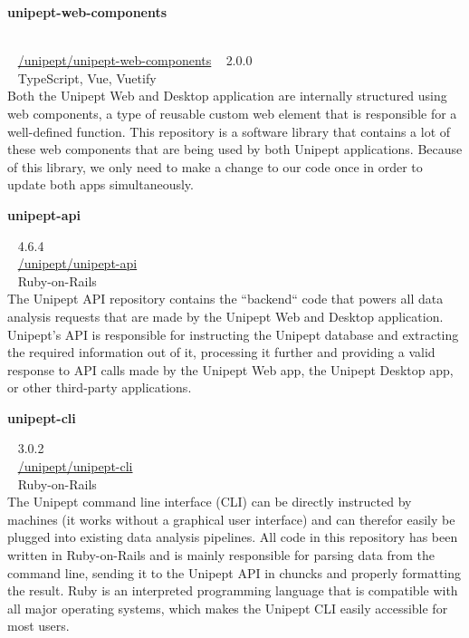 \pagebreak

\begin{large}\textbf{\textsf{unipept-web-components}}\end{large} \\
\faGithub ~ \href{https://github.com/unipept/unipept-web-components}{\textsf{/unipept/unipept-web-components}} \hfill \faTag ~ \textsf{2.0.0} \\
\faCode ~ \textsf{TypeScript, Vue, Vuetify} \\
Both the Unipept Web and Desktop application are internally structured using web components, a type of reusable custom web element that is responsible for a well-defined function.
This repository is a software library that contains a lot of these web components that are being used by both Unipept applications.
Because of this library, we only need to make a change to our code once in order to update both apps simultaneously.

\begin{large}\textbf{\textsf{unipept-api}}\end{large} \hfill \faTag ~ \textsf{4.6.4} \\
\faGithub ~ \href{https://github.com/unipept/unipept-api}{\textsf{/unipept/unipept-api}} \\
\faCode ~ \textsf{Ruby-on-Rails} \\
The Unipept API repository contains the ``backend`` code that powers all data analysis requests that are made by the Unipept Web and Desktop application.
Unipept's API is responsible for instructing the Unipept database and extracting the required information out of it, processing it further and providing a valid response to API calls made by the Unipept Web app, the Unipept Desktop app, or other third-party applications.

\begin{large}\textbf{\textsf{unipept-cli}}\end{large} \hfill \faTag ~ \textsf{3.0.2} \\
\faGithub ~ \href{https://github.com/unipept/unipept-cli}{\textsf{/unipept/unipept-cli}} \\
\faCode ~ \textsf{Ruby-on-Rails} \\
The Unipept command line interface (CLI) can be directly instructed by machines (it works without a graphical user interface) and can therefor easily be plugged into existing data analysis pipelines.
All code in this repository has been written in Ruby-on-Rails and is mainly responsible for parsing data from the command line, sending it to the Unipept API in chuncks and properly formatting the result.
Ruby is an interpreted programming language that is compatible with all major operating systems, which makes the Unipept CLI easily accessible for most users.

